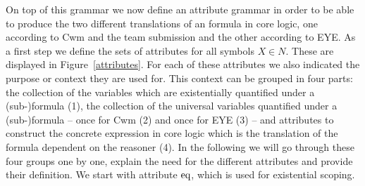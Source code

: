On top of this grammar we now define an attribute grammar in order to be able to produce the two different translations %
of an \nthree formula in core logic, one according to Cwm and the team submission and the other according to EYE.
As a first step we define the sets of attributes for all symbols $X\in N$.
These are displayed in Figure~\ref{attributes}. 
For each of these attributes we also indicated the purpose or context they are used for. This context can be grouped in four parts:  the collection of the variables which are existentially 
quantified under a (sub-)formula (1), the collection
of the universal variables quantified under a (sub-)formula -- once for Cwm (2) and once for EYE (3) -- and attributes to construct the concrete 
expression in core logic which is the translation of the \nthree 
formula dependent on the reasoner (4).
In the following we will go through these four groups one by one, explain the need for the different attributes and provide their definition. We start with attribute $\text{eq}$, which is used for existential scoping. 

